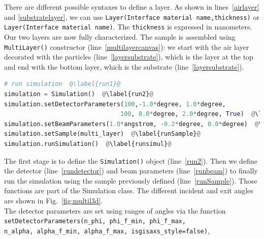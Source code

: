 \noindent There are different possible syntaxes to define a layer. As shown in
lines~\ref{airlayer} and \ref{substratelayer}, we can use
\texttt{Layer(Interface material name,thickness)} or
\texttt{Layer(Interface material name)}. The \texttt{thickness} is
expressed in  nanometers. \\

\noindent Our two layers are now fully characterized. The sample is assembled using
\texttt{MultiLayer()} constructor (line~\ref{multilayercanvas}): we start with the air layer decorated
with the particles (line~\ref{layersubstrate}), which is the layer at
the top and end with the bottom layer, which is the
substrate (line~\ref{layersubstrate}).


\begin{lstlisting}[language=python, style=eclipseboxed,name=ex1,nolol]
# run simulation  @\label{run1}@
simulation = Simulation()  @\label{run2}@
simulation.setDetectorParameters(100,-1.0*degree, 1.0*degree, 
                                100, 0.0*degree, 2.0*degree, True)  @\label{rundetector}@
simulation.setBeamParameters(1.0*angstrom, -0.2*degree, 0.0*degree)  @\label{runbeam}@
simulation.setSample(multi_layer)  @\label{runSample}@
simulation.runSimulation()  @\label{runsimul}@
\end{lstlisting}


\noindent The first stage is to define the \texttt{Simulation()} object (line~\ref{run2}). Then we define the detector (line~\ref{rundetector}) and beam
parameters (line~\ref{runbeam}) to finally run
the simulation using the sample previously defined
(line~\ref{runSample}). Those functions are part of the Simulation
class.  The
different incident and exit angles are
shown in Fig.~\ref{fig:multil3d}. \\

\noindent The detector parameters are set using ranges of angles via
the function\\

\noindent \texttt{setDetectorParameters(n\_phi, phi\_f\_min,
  phi\_f\_max,\\ \phantom{setDetectorParameters(}n\_alpha, alpha\_f\_min, alpha\_f\_max, isgisaxs\_style=false)}, \\

